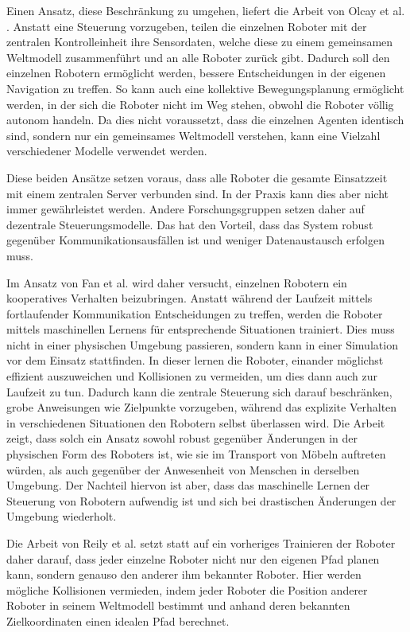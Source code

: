 Einen Ansatz, diese Beschränkung zu umgehen, liefert die Arbeit von Olcay et al. \cite{collectiveNav}. Anstatt eine Steuerung vorzugeben, teilen die einzelnen Roboter mit der zentralen Kontrolleinheit ihre Sensordaten, welche diese zu einem gemeinsamen Weltmodell zusammenführt und an alle Roboter zurück gibt. Dadurch soll den einzelnen Robotern ermöglicht werden, bessere Entscheidungen in der eigenen Navigation zu treffen. So kann auch eine kollektive Bewegungsplanung ermöglicht werden, in der sich die Roboter nicht im Weg stehen, obwohl die Roboter völlig autonom handeln. Da dies nicht voraussetzt, dass die einzelnen Agenten identisch sind, sondern nur ein gemeinsames Weltmodell verstehen, kann eine Vielzahl verschiedener Modelle verwendet werden.

Diese beiden Ansätze setzen voraus, dass alle Roboter die gesamte Einsatzzeit mit einem zentralen Server verbunden sind. In der Praxis kann dies aber nicht immer gewährleistet werden. Andere Forschungsgruppen setzen daher auf dezentrale Steuerungsmodelle. Das hat den Vorteil, dass das System robust gegenüber Kommunikationsausfällen ist und weniger Datenaustausch erfolgen muss.

Im Ansatz von Fan et al. \cite{mlTrain} wird daher versucht, einzelnen Robotern ein kooperatives Verhalten beizubringen. Anstatt während der Laufzeit mittels fortlaufender Kommunikation Entscheidungen zu treffen, werden die Roboter mittels maschinellen Lernens für entsprechende Situationen trainiert. Dies muss nicht in einer physischen Umgebung passieren, sondern kann in einer Simulation vor dem Einsatz stattfinden. In dieser lernen die Roboter, einander möglichst effizient auszuweichen und Kollisionen zu vermeiden, um dies dann auch zur Laufzeit zu tun. Dadurch kann die zentrale Steuerung sich darauf beschränken, grobe Anweisungen wie Zielpunkte vorzugeben, während das explizite Verhalten in verschiedenen Situationen den Robotern selbst überlassen wird. Die Arbeit zeigt, dass solch ein Ansatz sowohl robust gegenüber Änderungen in der physischen Form des Roboters ist, wie sie im Transport von Möbeln auftreten würden, als auch gegenüber der Anwesenheit von Menschen in derselben Umgebung. Der Nachteil hiervon ist aber, dass das maschinelle Lernen der Steuerung von Robotern aufwendig ist und sich bei drastischen Änderungen der Umgebung wiederholt.

Die Arbeit von Reily et al. \cite{silentSwarm} setzt statt auf ein vorheriges Trainieren der Roboter daher darauf, dass jeder einzelne Roboter nicht nur den eigenen Pfad planen kann, sondern genauso den anderer ihm bekannter Roboter. Hier werden mögliche Kollisionen vermieden, indem jeder Roboter die Position anderer Roboter in seinem Weltmodell bestimmt und anhand deren bekannten Zielkoordinaten einen idealen Pfad berechnet. 

